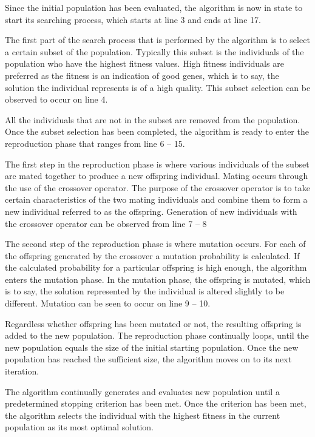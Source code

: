 Since the initial population has been evaluated, the algorithm is now in state to start its searching process, which starts at line 3 and ends at line 17.

The first part of the search process that is performed by the algorithm is to select a certain subset of the population. Typically this subset is the individuals of the population who have the highest fitness values. High fitness individuals are preferred as the fitness is an indication of good genes, which is to say, the solution the individual represents is of a high quality. This subset selection can be observed to occur on line 4.

All the individuals that are not in the subset are removed from the population. Once the subset selection has been completed, the algorithm is ready to enter the reproduction phase that ranges from line 6 -- 15.

The first step in the reproduction phase is where various individuals of the subset are mated together to produce a new offspring individual. Mating occurs through the use of the crossover operator. The purpose of the crossover operator is to take certain characteristics of the two mating individuals and combine them to form a new individual referred to as the offspring. Generation of new individuals with the crossover operator can be observed from line 7 -- 8

The second step of the reproduction phase is where mutation occurs. For each of the offspring generated by the crossover a mutation probability is calculated. If the calculated probability for a particular offspring is high enough, the algorithm enters the mutation phase. In the mutation phase, the offspring is mutated, which is to say, the solution represented by the individual is altered slightly to be different. Mutation can be seen to occur on line 9 -- 10.

Regardless whether offspring has been mutated or not, the resulting offspring is added to the new population. The reproduction phase continually loops, until the new population equals the size of the initial starting population. Once the new population has reached the sufficient size, the algorithm moves on to its next iteration.

The algorithm continually generates and evaluates new population until a predetermined stopping criterion has been met. Once the criterion has been met, the algorithm selects the individual with the highest fitness in the current population as its most optimal solution.

